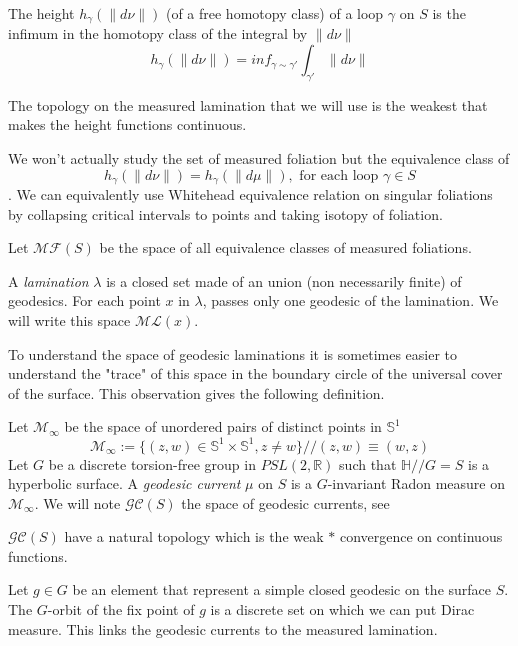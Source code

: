 The height $h_\gamma(\| d \nu \|)$ (of a free homotopy class) of a loop $\gamma$ on $S$ is the infimum in the homotopy class of the integral by $\| d \nu \|$
\[
h_\gamma(\| d \nu \|)=inf_{\gamma \sim \gamma'} \int_{\gamma'} \| d \nu \|
\]

The topology on the measured lamination that we will use is the weakest that makes the height functions continuous.

\begin{rmq}
We won't actually study the set of measured foliation but the equivalence class of \[
h_\gamma(\| d \nu \|)=h_\gamma(\| d \mu \|), \text{ for each loop } \gamma \in S
\].
We can equivalently use Whitehead equivalence relation on singular foliations by collapsing critical intervals to points and taking isotopy of foliation.
\end{rmq}

Let $\mathcal{MF}(S)$ be the space of all equivalence classes of measured foliations.

\begin{dfnt}
A \emph{lamination} $\lambda$ is a closed set made of an union (non necessarily finite) of geodesics.
For each point $x$ in $\lambda$, passes only one geodesic of the lamination.
We will write this space $\mathcal{ML}(x)$.
\end{dfnt}

To understand the space of geodesic laminations it is sometimes easier to understand the "trace" of this space in the boundary circle of the universal cover of the surface. This observation gives the following definition.

\begin{dfnt}
Let $\mathcal{M}_\infty$ be the space of unordered pairs of distinct points in $\mathbb{S}^1$ \[
\mathcal{M}_\infty := \{(z,w) \in \mathbb{S}^1 \times \mathbb{S}^1 , z \neq w\}//(z,w) \equiv (w,z)
\]
Let $G$ be a discrete torsion-free group in $PSL(2,\mathbb{R})$ such that $\mathbb{H}//G=S$ is a hyperbolic surface.
A \emph{geodesic current} $\mu$ on $S$ is a $G$-invariant Radon measure on $\mathcal{M}_\infty$.
We will note $\mathcal{GC}(S)$ the space of geodesic currents, see \cite{kapovich2009hyperbolic}
\end{dfnt}

\begin{rmq}
$\mathcal{GC}(S)$ have a natural topology which is the weak $*$ convergence on continuous functions.
\end{rmq}

\begin{exmp}
Let $g \in G$ be an element that represent a simple closed geodesic on the surface $S$. The $G$-orbit of the fix point of $g$ is a discrete set on which we can put Dirac measure. This links the geodesic currents to the measured lamination.
\end{exmp}

